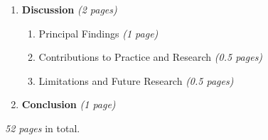 \begin{enumerate}
    \item \textbf{Discussion} \textit{(2 pages)}

    \begin{enumerate}
        \item Principal Findings \textit{(1 page)}

        \item Contributions to Practice and Research \textit{(0.5 pages)}

        \item Limitations and Future Research \textit{(0.5 pages)}
    \end{enumerate}

    \item \textbf{Conclusion} \textit{(1 page)}
	
\end{enumerate}

\textit{52 pages} in total.